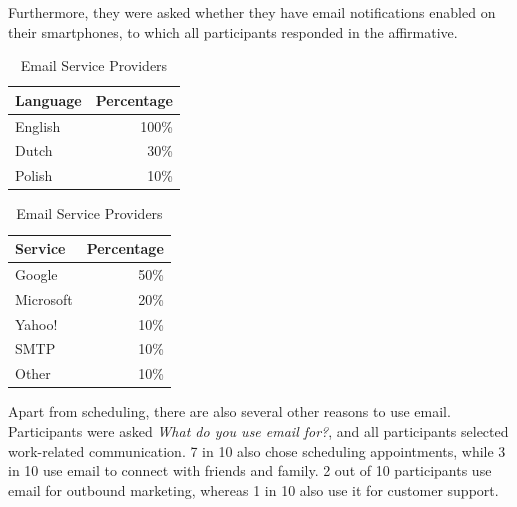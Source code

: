 \documentclass{article}
\begin{document}
Furthermore, they were asked whether they have email notifications enabled on their smartphones, to which all participants responded in the affirmative.

\begin{table}[!htb]
    \begin{minipage}{.5\linewidth}
   	 \caption{Email Languages}
      \centering
        \begin{tabular}{lr}
	        \hline
            \textbf{Language} & \textbf{Percentage} \\
            \hline
            English & 100\% \\
            Dutch & 30\% \\
            Polish & 10\% \\
            \hline
        \end{tabular}
    \end{minipage}%
    \hspace{.1cm}
    \begin{minipage}{.5\linewidth}
      \centering
	    \caption{Email Service Providers}
        \begin{tabular}{lr}
	        \hline
            \textbf{Service} & \textbf{Percentage} \\
            \hline
            Google & 50\% \\
            Microsoft & 20\% \\
            Yahoo! & 10\% \\
            SMTP & 10\% \\
            Other & 10\% \\
            \hline
        \end{tabular}
    \end{minipage} 
\end{table}

Apart from scheduling, there are also several other reasons to use email. Participants were asked \emph{What do you use email for?}, and all participants selected work-related communication. 7 in 10 also chose scheduling appointments, while 3 in 10 use email to connect with friends and family. 2 out of 10 participants use email for outbound marketing, whereas 1 in 10 also use it for customer support.
\end{document}
